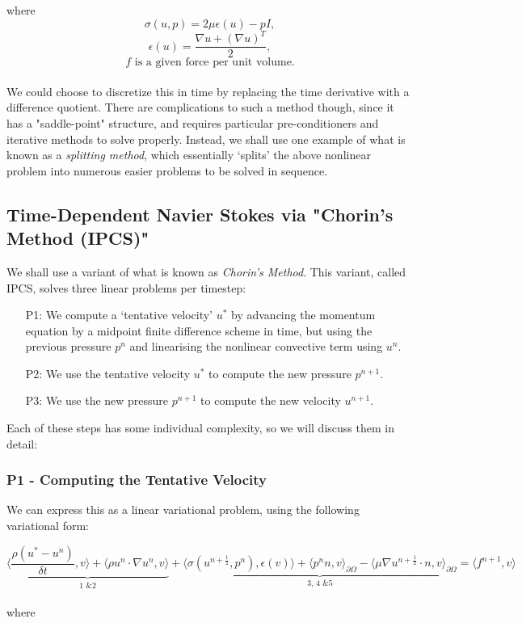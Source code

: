 \documentclass[english, 11pt]{article}
\begin{document}
where
$$\sigma(u,p) = 2\mu\epsilon(u) - pI, $$
$$\epsilon(u) = \frac{\nabla u + (\nabla u)^T}{2}, $$
$$f \text{ is a given force per unit volume.} $$
\\
We could choose to discretize this in time by replacing the time derivative with a difference quotient. There are complications to such a method though, since it has a "saddle-point" structure, and requires particular pre-conditioners and iterative methods to solve properly. Instead, we shall use one example of what is known as a \textit{splitting method}, which essentially `splits' the above nonlinear problem into numerous easier problems to be solved in sequence.

\subsection{Time-Dependent Navier Stokes via "Chorin's Method (IPCS)"}

We shall use a variant of what is known as \textit{Chorin's Method}. This variant, called IPCS, solves three linear problems per timestep:

\begin{enumerate}
	\item[P1:] We compute a `tentative velocity' $u^*$ by advancing the momentum equation by a midpoint finite difference scheme in time, but using the previous pressure $p^n$ and linearising the nonlinear convective term using $u^n$.
	\item[P2:] We use the tentative velocity $u^*$ to compute the new pressure $p^{n+1}$.
	\item[P3:] We use the new pressure $p^{n+1}$ to compute the new velocity $u^{n+1}$.
\end{enumerate}

Each of these steps has some individual complexity, so we will discuss them in detail:

\subsubsection{P1 - Computing the Tentative Velocity}

We can express this as a linear variational problem, using the following variational form:

\begin{equation}\label{eqn:p1}
	\underbrace{\Big\langle \frac{\rho (u^* - u^n)}{\delta t} , v \Big\rangle + \Big\langle \rho u^n \cdot \nabla u^n , v \Big\rangle}_{\text{1 \& 2}} + \underbrace{\Big\langle \sigma (u^{n + \frac{1}{2}}, p^n) , \epsilon(v) \Big\rangle + \Big\langle p^n n, v\Big\rangle_{\partial\Omega} - \Big\langle \mu \nabla u^{n + \frac{1}{2}} \cdot n, v \Big\rangle_{\partial\Omega}}_{\text{3, 4 \& 5}} = \Big\langle f^{n+1}, v \Big\rangle
\end{equation}
\\
where
\end{document}
